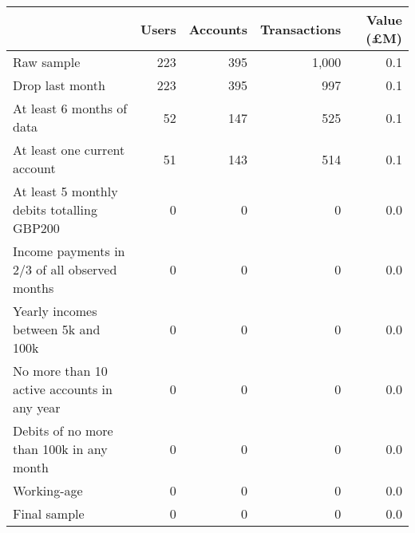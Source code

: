 \begin{tabular}{lrrrr}
\toprule
                                              & Users & Accounts & Transactions & Value (\pounds M) \\
\midrule
                                   Raw sample &   223 &      395 &        1,000 &               0.1 \\
                              Drop last month &   223 &      395 &          997 &               0.1 \\
                    At least 6 months of data &    52 &      147 &          525 &               0.1 \\
                 At least one current account &    51 &      143 &          514 &               0.1 \\
   At least 5 monthly debits totalling GBP200 &     0 &        0 &            0 &               0.0 \\
Income payments in 2/3 of all observed months &     0 &        0 &            0 &               0.0 \\
           Yearly incomes between 5k and 100k &     0 &        0 &            0 &               0.0 \\
  No more than 10 active accounts in any year &     0 &        0 &            0 &               0.0 \\
     Debits of no more than 100k in any month &     0 &        0 &            0 &               0.0 \\
                                  Working-age &     0 &        0 &            0 &               0.0 \\
                                 Final sample &     0 &        0 &            0 &               0.0 \\
\bottomrule
\end{tabular}
